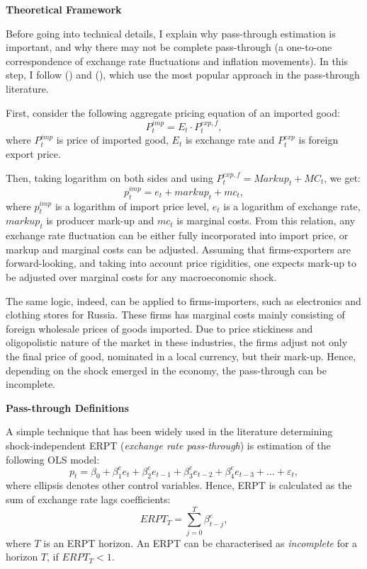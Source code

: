 \documentclass[12pt, a4paper]{extarticle}
\begin{document}
\begin{center}
	\textbf{Theoretical Framework}
\end{center}

Before going into technical details, I explain why pass-through estimation is important, and why there may not be complete pass-through (a one-to-one correspondence of exchange rate fluctuations and inflation movements). In this step, I follow (\cite{Comunale2017}) and (\cite{Forbes2018}), which use the most popular approach in the pass-through literature.

First, consider the following aggregate pricing equation of an imported good:
\begin{equation}
	P_t^{imp} = E_t \cdot P_t^{exp, f},
\end{equation}
where $P_t^{imp}$ is price of imported good, $E_t$ is exchange rate and $P_t^{exp}$ is foreign export price. 

Then, taking logarithm on both sides and using $P_t^{exp, f} = Markup_t + MC_t$, we get:
\begin{equation}
	p_t^{imp} = e_t + markup_t + mc_t,
\end{equation}
where $p_t^{imp}$ is a logarithm of import price level, $e_t$ is a logarithm of exchange rate, $markup_t$ is producer mark-up and $mc_t$ is marginal costs. From this relation, any exchange rate fluctuation can be either fully incorporated into import price, or markup and marginal costs can be adjusted. Assuming that firms-exporters are forward-looking, and taking into account price rigidities, one expects mark-up to be adjusted over marginal costs for any macroeconomic shock. 

The same logic, indeed, can be applied to firms-importers, such as electronics and clothing stores for Russia. These firms has marginal costs mainly consisting of foreign wholesale prices of goods imported. Due to price stickiness and oligopolistic nature of the market in these industries, the firms adjust not only the final price of good, nominated in a local currency, but their mark-up. Hence, depending on the shock emerged in the economy, the pass-through can be incomplete.

\begin{center}
	\textbf{Pass-through Definitions}
\end{center}

A simple technique that has been widely used in the literature determining shock-in\-de\-pen\-dent ERPT (\textit{exchange rate pass-through}) is estimation of the following OLS model:
\begin{equation}
	p_t = \beta_0 + \beta^{e}_1 e_t + \beta^{e}_2 e_{t-1} + \beta^{e}_3 e_{t-2} + \beta^{e}_4 e_{t-3} + \ldots+ \varepsilon_t,
\end{equation}
where ellipsis denotes other control variables. Hence, ERPT is calculated as the sum of exchange rate lags coefficients:
\begin{equation}
	ERPT_T = \sum_{j=0}^{T} \beta^e_{t-j},
\end{equation}
where $T$ is an ERPT horizon. An ERPT can be characterised as \textit{incomplete} for a horizon $T$, if $ERPT_T < 1$. 
\end{document}
